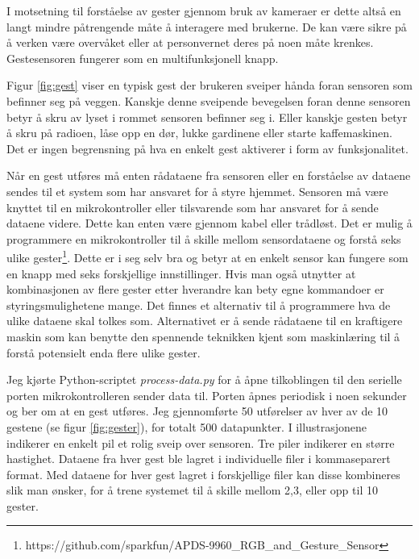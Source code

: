 I motsetning til forståelse av gester gjennom bruk av kameraer er dette altså en langt mindre påtrengende måte å interagere med brukerne. De kan være sikre på å verken være overvåket eller at personvernet deres på noen måte krenkes. Gestesensoren fungerer som en multifunksjonell knapp.

Figur \ref{fig:gest} viser en typisk gest der brukeren sveiper hånda foran sensoren som befinner seg på veggen. Kanskje denne sveipende bevegelsen foran denne sensoren betyr å skru av lyset i rommet sensoren befinner seg i. Eller kanskje gesten betyr å skru på radioen, låse opp en dør, lukke gardinene eller starte kaffemaskinen. Det er ingen begrensning på hva en enkelt gest aktiverer i form av funksjonalitet.

Når en gest utføres må enten rådataene fra sensoren eller en forståelse av dataene sendes til et system som har ansvaret for å styre hjemmet. Sensoren må være knyttet til en mikrokontroller eller tilsvarende som har ansvaret for å sende dataene videre. Dette kan enten være gjennom kabel eller trådløst. Det er mulig å programmere en mikrokontroller til å skille mellom sensordataene og forstå seks ulike gester\footnote{https://github.com/sparkfun/APDS-9960\_RGB\_and\_Gesture\_Sensor}. Dette er i seg selv bra og betyr at en enkelt sensor kan fungere som en knapp med seks forskjellige innstillinger. Hvis man også utnytter at kombinasjonen av flere gester etter hverandre kan bety egne kommandoer er styringsmulighetene mange. Det finnes et alternativ til å programmere hva de ulike dataene skal tolkes som. Alternativet er å sende rådataene til en kraftigere maskin som kan benytte den spennende teknikken kjent som maskinlæring til å forstå potensielt enda flere ulike gester.

Jeg kjørte Python-scriptet \emph{process-data.py} for å åpne tilkoblingen til den serielle porten mikrokontrolleren sender data til. Porten åpnes periodisk i noen sekunder og ber om at en gest utføres. Jeg gjennomførte 50 utførelser av hver av de 10 gestene (se figur \ref{fig:gester}), for totalt 500 datapunkter. I illustrasjonene indikerer en enkelt pil et rolig sveip over sensoren. Tre piler indikerer en større hastighet. Dataene fra hver gest ble lagret i individuelle filer i kommaseparert format. Med dataene for hver gest lagret i forskjellige filer kan disse kombineres slik man ønsker, for å trene systemet til å skille mellom 2,3, eller opp til 10 gester. 

